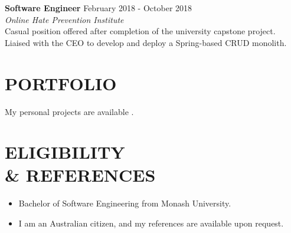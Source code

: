 \documentclass[margin, 11pt]{style}
\begin{document}
\begin{resume}
\begin{itemize}
\end{itemize}


\textbf{Software Engineer} \hfill February 2018 - October 2018 \\
{\sl Online Hate Prevention Institute}
\vspace{15pt}\\
Casual position offered after completion of the university capstone project. Liaised with the CEO to develop and deploy a Spring-based CRUD monolith.

\section{PORTFOLIO}

My personal projects are available \underline{}.

\section{ELIGIBILITY \\ \& REFERENCES}

\begin{itemize}

\item Bachelor of Software Engineering from Monash University.
\item I am an Australian citizen, and my references are available upon request.


\end{itemize}

\end{resume}
\end{document}
